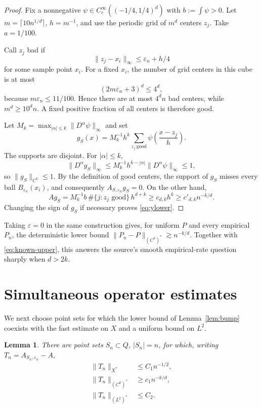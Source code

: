 \documentclass[11pt]{article}
\newtheorem{lemma}[theorem]{Lemma}
\begin{document}
\begin{proof}
Fix a nonnegative $\psi\in C_c^\infty((-1/4,1/4)^d)$ with
$b:=\int\psi>0$.  Let $m=\lceil10n^{1/d}\rceil$, $h=m^{-1}$, and use the
periodic grid of $m^d$ centers $z_j$.  Take $a=1/100$.

Call $z_j$ bad if
\[
 \|z_j-x_i\|_\infty\le \varepsilon_n+h/4
\]
for some sample point $x_i$.  For a fixed $x_i$, the number of grid centers
in this cube is at most
\[
 (2m\varepsilon_n+3)^d\le4^d,
\]
because $m\varepsilon_n\le 11/100$.  Hence there are at most $4^dn$ bad
centers, while $m^d\ge10^dn$.  A fixed positive fraction of all centers is
therefore good.

Let $M_k=\max_{|\alpha|\le k}\|D^\alpha\psi\|_\infty$ and set
\[
 g_S(x)=M_k^{-1}h^k\sum_{z_j\ \mathrm{good}}
 \psi\!\left(\frac{x-z_j}{h}\right).
\]
The supports are disjoint.  For $|\alpha|\le k$,
\[
 \|D^\alpha g_S\|_\infty
 \le M_k^{-1}h^{k-|\alpha|}\|D^\alpha\psi\|_\infty\le1,
\]
so $\|g_S\|_{C^k}\le1$.  By the definition of good centers, the support of
$g_S$ misses every ball $B_{\varepsilon_n}(x_i)$, and consequently
$A_{S,\varepsilon_n}g_S=0$.  On the other hand,
\[
 Ag_S=M_k^{-1}b\,\#\{j:z_j\text{ good}\}\,h^{d+k}
 \ge c_{d,k}h^k\ge c'_{d,k}n^{-k/d}.
\]
Changing the sign of $g_S$ if necessary proves \eqref{eq:ylower}.
\end{proof}

Taking $\varepsilon=0$ in the same construction gives, for uniform $P$ and
every empirical $P_n$, the deterministic lower bound
$\|P_n-P\|_{(C^k)^*}\gtrsim n^{-k/d}$.  Together with
\eqref{eq:known-upper}, this answers the source's smooth empirical-rate
question sharply when $d>2k$.

\section{Simultaneous operator estimates}

We next choose point sets for which the lower bound of
Lemma~\ref{lem:bump} coexists with the fast estimate on $X$ and a uniform
bound on $L^2$.

\begin{lemma}\label{lem:operators}
There are point sets $S_n\subset Q$, $|S_n|=n$, for which, writing
$T_n=A_{S_n,\varepsilon_n}-A$,
\begin{align}
 \|T_n\|_{X^*}&\le C_1 n^{-1/2},\label{eq:xest}\\
 \|T_n\|_{(C^k)^*}&\ge c_1 n^{-k/d},\label{eq:yest}\\
 \|T_n\|_{(L^2)^*}&\le C_2.\label{eq:zest}
\end{align}
\end{lemma}
\end{document}
